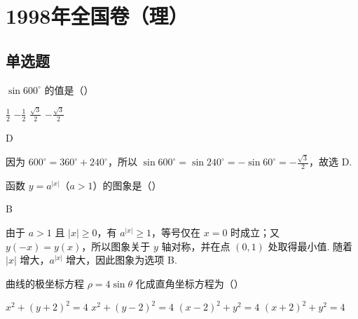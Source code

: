 \chapter{1998年全国卷（理）}
\section{单选题}

\begin{problem}
\(\sin 600^{\circ}\) 的值是（\quad）

\choices
    {\(\frac{1}{2}\)}
    {\(-\frac{1}{2}\)}
    {\(\frac{\sqrt{3}}{2}\)}
    {\(-\frac{\sqrt{3}}{2}\)}
\end{problem}

\begin{answer}
D
\end{answer}

\begin{solution}
因为 \(600^{\circ}=360^{\circ}+240^{\circ}\)，所以
\(\sin 600^{\circ}=\sin 240^{\circ}=-\sin 60^{\circ}=-\frac{\sqrt{3}}{2}\)，故选 D.
\end{solution}

\begin{problem}
函数 \(y=a^{|x|}\)（\(a>1\)）的图象是（\quad）

    {}
    {}
    {}
\end{problem}

\begin{answer}
B
\end{answer}

\begin{solution}
由于 \(a>1\) 且 \(|x|\geq0\)，有 \(a^{|x|}\geq1\)，等号仅在 \(x=0\) 时成立；又 \(y(-x)=y(x)\)，所以图象关于 \(y\) 轴对称，并在点 \((0,1)\) 处取得最小值. 随着 \(|x|\) 增大，\(a^{|x|}\) 增大，因此图象为选项 B.
\end{solution}

\begin{problem}
曲线的极坐标方程 \(\rho = 4\sin \theta \) 化成直角坐标方程为（\quad）

\choices
    {\(x^{2} + (y + 2)^{2} = 4\)}
    {\(x^{2} + (y - 2)^{2} = 4\)}
    {\((x - 2)^{2} + y^{2} = 4\)}
    {\((x + 2)^{2} + y^{2} = 4\)}
\end{problem}

